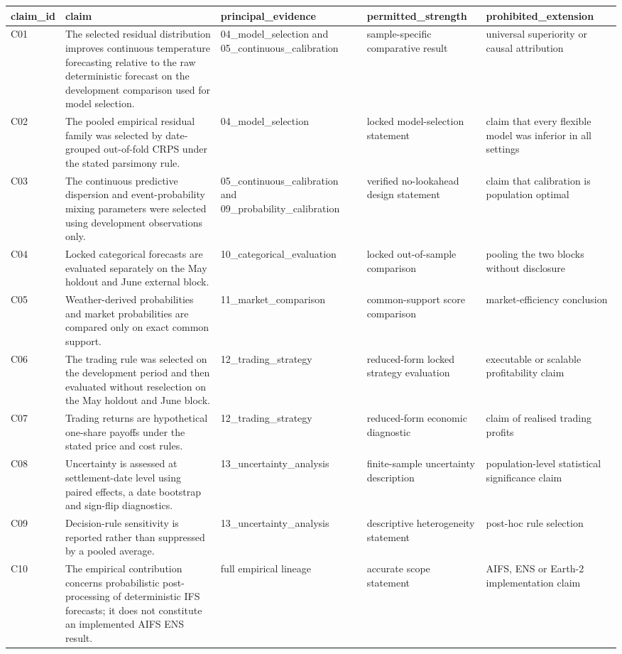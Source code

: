 \begin{tabular}{lllll}
\toprule
claim\_id & claim & principal\_evidence & permitted\_strength & prohibited\_extension \\
\midrule
C01 & The selected residual distribution improves continuous temperature forecasting relative to the raw deterministic forecast on the development comparison used for model selection. & 04\_model\_selection and 05\_continuous\_calibration & sample-specific comparative result & universal superiority or causal attribution \\
C02 & The pooled empirical residual family was selected by date-grouped out-of-fold CRPS under the stated parsimony rule. & 04\_model\_selection & locked model-selection statement & claim that every flexible model was inferior in all settings \\
C03 & The continuous predictive dispersion and event-probability mixing parameters were selected using development observations only. & 05\_continuous\_calibration and 09\_probability\_calibration & verified no-lookahead design statement & claim that calibration is population optimal \\
C04 & Locked categorical forecasts are evaluated separately on the May holdout and June external block. & 10\_categorical\_evaluation & locked out-of-sample comparison & pooling the two blocks without disclosure \\
C05 & Weather-derived probabilities and market probabilities are compared only on exact common support. & 11\_market\_comparison & common-support score comparison & market-efficiency conclusion \\
C06 & The trading rule was selected on the development period and then evaluated without reselection on the May holdout and June block. & 12\_trading\_strategy & reduced-form locked strategy evaluation & executable or scalable profitability claim \\
C07 & Trading returns are hypothetical one-share payoffs under the stated price and cost rules. & 12\_trading\_strategy & reduced-form economic diagnostic & claim of realised trading profits \\
C08 & Uncertainty is assessed at settlement-date level using paired effects, a date bootstrap and sign-flip diagnostics. & 13\_uncertainty\_analysis & finite-sample uncertainty description & population-level statistical significance claim \\
C09 & Decision-rule sensitivity is reported rather than suppressed by a pooled average. & 13\_uncertainty\_analysis & descriptive heterogeneity statement & post-hoc rule selection \\
C10 & The empirical contribution concerns probabilistic post-processing of deterministic IFS forecasts; it does not constitute an implemented AIFS ENS result. & full empirical lineage & accurate scope statement & AIFS, ENS or Earth-2 implementation claim \\
\bottomrule
\end{tabular}
